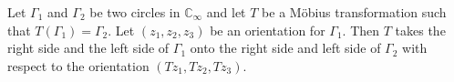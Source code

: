 Let $\Gamma_1$ and $\Gamma_2$ be two circles in $\mathbb{C}_{\infty}$ and let $T$ be a M\"obius transformation such that $T(\Gamma_1) = \Gamma_2$. Let $(z_1, z_2, z_3)$ be an orientation for $\Gamma_1$. Then $T$ takes the right side and the left side of $\Gamma_1$ onto the right side and left side of $\Gamma_2$ with respect to the orientation $(Tz_1, Tz_2, Tz_3)$.
